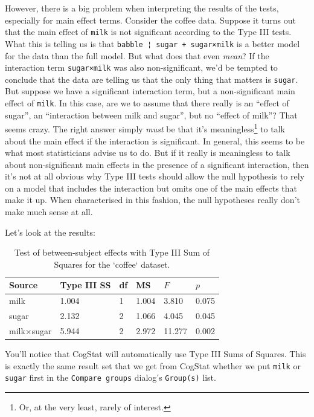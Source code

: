 \documentclass[
]{book}
\theoremstyle{definition}
\theoremstyle{definition}
\theoremstyle{definition}
\theoremstyle{definition}
\theoremstyle{remark}
\begin{document}
However, there is a big problem when interpreting the results of the tests, especially for main effect terms. Consider the coffee data. Suppose it turns out that the main effect of \texttt{milk} is not significant according to the Type III tests. What this is telling us is that \texttt{babble\ ¦\ sugar\ +\ sugar×milk} is a better model for the data than the full model. But what does that even \emph{mean}? If the interaction term \texttt{sugar×milk} was also non-significant, we'd be tempted to conclude that the data are telling us that the only thing that matters is \texttt{sugar}. But suppose we have a significant interaction term, but a non-significant main effect of \texttt{milk}. In this case, are we to assume that there really is an ``effect of sugar'', an ``interaction between milk and sugar'', but no ``effect of milk''? That seems crazy. The right answer simply \emph{must} be that it's meaningless\footnote{Or, at the very least, rarely of interest.} to talk about the main effect if the interaction is significant. In general, this seems to be what most statisticians advise us to do. But if it really is meaningless to talk about non-significant main effects in the presence of a significant interaction, then it's not at all obvious why Type III tests should allow the null hypothesis to rely on a model that includes the interaction but omits one of the main effects that make it up. When characterised in this fashion, the null hypotheses really don't make much sense at all.

Let's look at the results:

\begin{table}[!h]

\caption{\label{tab:unnamed-chunk-94}Test of between-subject effects with Type III Sum of Squares for the `coffee` dataset.}
\centering
\begin{tabular}[t]{llllll}
\toprule
Source & Type III SS & df & MS & $F$ & $p$\\
\midrule
milk & 1.004 & 1 & 1.004 & 3.810 & 0.075\\
sugar & 2.132 & 2 & 1.066 & 4.045 & 0.045\\
milk×sugar & 5.944 & 2 & 2.972 & 11.277 & 0.002\\
\bottomrule
\end{tabular}
\end{table}

You'll notice that CogStat will automatically use Type III Sums of Squares. This is exactly the same result set that we get from CogStat whether we put \texttt{milk} or \texttt{sugar} first in the \texttt{Compare\ groups} dialog's \texttt{Group(s)} list.
\end{document}
